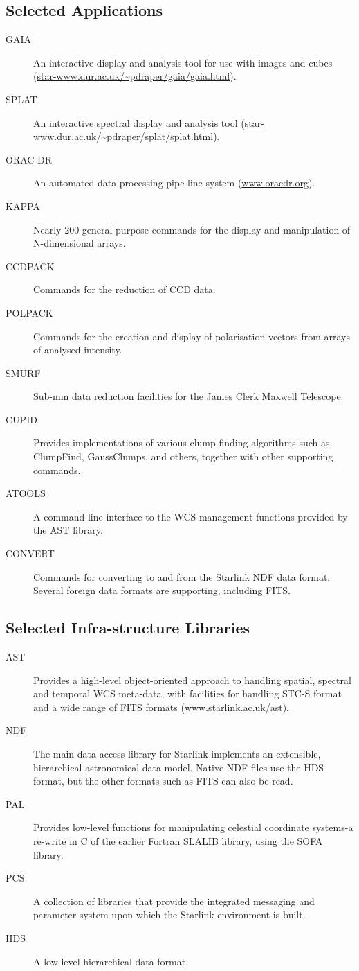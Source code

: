 \subsection{Selected Applications}
\begin{description}
\item[GAIA] An interactive display and analysis tool for use with images and cubes (\url{star-www.dur.ac.uk/~pdraper/gaia/gaia.html}).
\item[SPLAT] An interactive spectral display and analysis tool (\url{star-www.dur.ac.uk/~pdraper/splat/splat.html}).
\item[ORAC-DR] An automated data processing pipe-line system
(\url{www.oracdr.org}).
\item[KAPPA] Nearly 200 general purpose commands for the display and manipulation of N-dimensional arrays.
\item[CCDPACK] Commands for the reduction of CCD data.
\item[POLPACK] Commands for the creation and display of polarisation vectors from arrays of analysed intensity.
\item[SMURF] Sub-mm data reduction facilities for the James Clerk Maxwell Telescope.
\item[CUPID] Provides implementations of various clump-finding algorithms such as ClumpFind, GaussClumps, and others, together with other supporting commands.
\item[ATOOLS] A command-line interface to the WCS management functions provided by the AST library.
\item[CONVERT] Commands for converting to and from the Starlink NDF data format. Several foreign data formats are supporting, including FITS.
\end{description}

\subsection{Selected Infra-structure Libraries}
\begin{description}
\item[AST] Provides a high-level object-oriented approach to handling spatial, spectral and temporal WCS meta-data, with facilities for handling STC-S format and a wide range of FITS formats
(\url{www.starlink.ac.uk/ast}).

\item[NDF] The main data access library for Starlink-implements an extensible, hierarchical astronomical data model. Native NDF files use the HDS format, but the other formats such as FITS can also be read.
\item[PAL] Provides low-level functions for manipulating celestial coordinate systems-a re-write in C of the earlier Fortran SLALIB library, using the SOFA library.
\item[PCS] A collection of libraries that provide the integrated messaging and parameter system upon which the Starlink environment is built.
\item[HDS] A low-level hierarchical data format.
\end{description}

